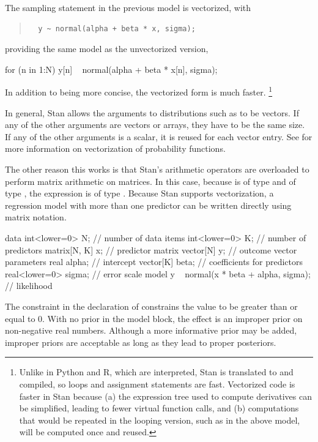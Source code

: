 The sampling statement in the previous model is vectorized, with
%
\begin{quote}
\begin{Verbatim}
  y ~ normal(alpha + beta * x, sigma);
\end{Verbatim}
\end{quote}
%
providing the same model as the unvectorized version,
%
\begin{stancode}
  for (n in 1:N)
    y[n] ~ normal(alpha + beta * x[n], sigma);
\end{stancode}
%
In addition to being more concise, the vectorized form is much faster.%
%
\footnote{Unlike in Python and R, which are interpreted, Stan is
  translated to \Cpp and compiled, so loops and assignment statements
  are fast.  Vectorized code is faster in Stan because (a) the
  expression tree used to compute derivatives can be simplified,
  leading to fewer virtual function calls, and (b) computations that
  would be repeated in the looping version, such as 
  in the above model, will be computed once and reused.}

In general, Stan allows the arguments to distributions such as
 to be vectors.  If any of the other arguments are
vectors or arrays, they have to be the same size.  If any of the other
arguments is a scalar, it is reused for each vector entry.  See
 for more information on vectorization of
probability functions.

The other reason this works is that Stan's arithmetic operators are
overloaded to perform matrix arithmetic on matrices.  In this case,
because  is of type  and  of type
, the expression  is of type .
Because Stan supports vectorization, a regression model with more than
one predictor can be written directly using matrix notation.
%
\begin{stancode}
data {
  int<lower=0> N;   // number of data items
  int<lower=0> K;   // number of predictors
  matrix[N, K] x;   // predictor matrix
  vector[N] y;      // outcome vector
}
parameters {
  real alpha;           // intercept
  vector[K] beta;       // coefficients for predictors
  real<lower=0> sigma;  // error scale
}
model {
  y ~ normal(x * beta + alpha, sigma);  // likelihood
}
\end{stancode}
%
The constraint  in the declaration of 
constrains the value to be greater than or equal to 0.  With no prior
in the model block, the effect is an improper prior on non-negative
real numbers.  Although a more informative prior may be added, improper
priors are acceptable as long as they lead to proper posteriors.

